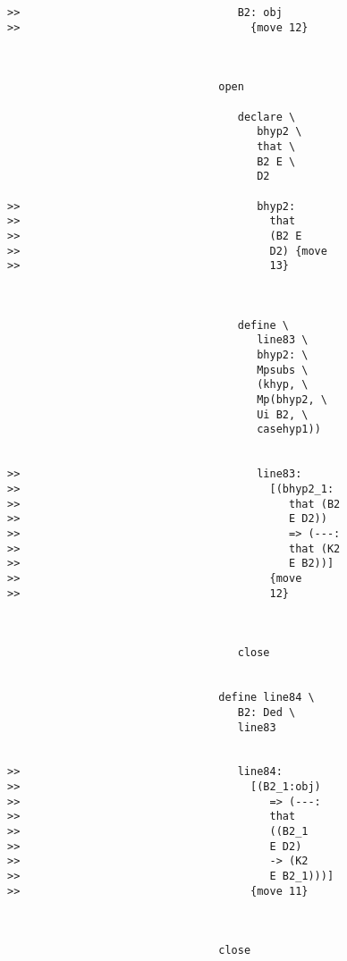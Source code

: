 \documentclass[12pt]{article}
\begin{document}
\begin{verbatim}
>>                                  B2: obj
>>                                    {move 12}



                                 open

                                    declare \
                                       bhyp2 \
                                       that \
                                       B2 E \
                                       D2

>>                                     bhyp2:
>>                                       that
>>                                       (B2 E
>>                                       D2) {move
>>                                       13}



                                    define \
                                       line83 \
                                       bhyp2: \
                                       Mpsubs \
                                       (khyp, \
                                       Mp(bhyp2, \
                                       Ui B2, \
                                       casehyp1))


>>                                     line83:
>>                                       [(bhyp2_1:
>>                                          that (B2
>>                                          E D2))
>>                                          => (---:
>>                                          that (K2
>>                                          E B2))]
>>                                       {move
>>                                       12}



                                    close


                                 define line84 \
                                    B2: Ded \
                                    line83


>>                                  line84:
>>                                    [(B2_1:obj)
>>                                       => (---:
>>                                       that
>>                                       ((B2_1
>>                                       E D2)
>>                                       -> (K2
>>                                       E B2_1)))]
>>                                    {move 11}



                                 close


\end{verbatim}
\end{document}

